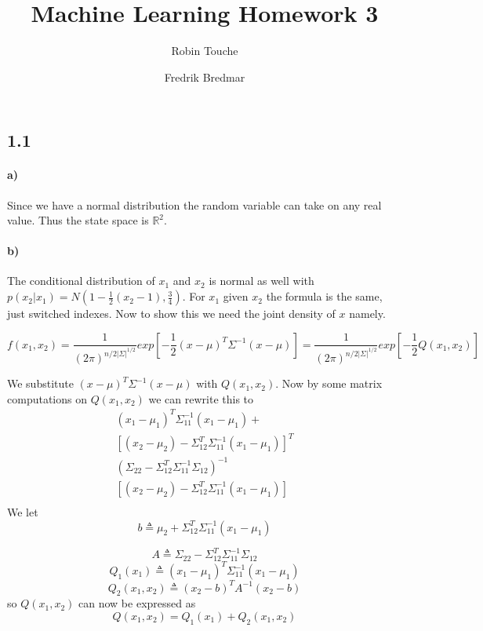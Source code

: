 \documentclass{article}
\author{
  Robin Touche \\
  \and
  Fredrik Bredmar
}
\title{Machine Learning Homework 3}
\begin{document}
\maketitle

\subsection*{1.1}
\paragraph{a)}

Since we have a normal distribution the random variable can take on any real
value. Thus the state space is $\mathbb{R}^2$.

\paragraph{b)}

The conditional distribution of $x_1$ and $x_2$ is normal as well with
$p(x_2|x_1) = N(1 - \frac{1}{2}(x_2 - 1), \frac{3}{4})$. For $x_1$ given $x_2$ 
the formula is the same, just switched indexes. 
Now to show this we need the joint density of $x$ namely.
     
$$ f(x_1, x_2) = \frac{1}{(2\pi)^{n/2|\Sigma|^{1/2}}}exp[-\frac{1}{2}(x-\mu)^T\Sigma^{-1}(x-\mu)] = \frac{1}{(2\pi)^{n/2|\Sigma|^{1/2}}}exp[-\frac{1}{2}Q(x_1,x_2)]$$


We substitute $(x-\mu)^T\Sigma^{-1}(x-\mu)$ with $Q(x_1,x_2)$. 
Now by some matrix computations on $Q(x_1,x_2)$ we can rewrite this to 
\begin{equation*}
  \begin{split}
(x_1 - \mu_1)^T\Sigma_{11}^{-1}(x_1 - \mu_1) + \\
[(x_2 - \mu_2) - \Sigma^T_{12}\Sigma^{-1}_{11}(x_1 - \mu_1)]^T \\
(\Sigma_{22} - \Sigma^T_{12}\Sigma_{11}^{-1}\Sigma_{12})^{-1} \\
[(x_2 - \mu_2) - \Sigma^T_{12}\Sigma^{-1}_{11}(x_1 - \mu_1)] \\
\end{split}
\end{equation*}
We let $$ b \triangleq \mu_2 + \Sigma^T_{12}\Sigma_{11}^{-1}(x_1 - \mu_1) $$

$$ A \triangleq \Sigma_{22} - \Sigma_{12}^T\Sigma_{11}^{-1}\Sigma_{12}$$
$$Q_1(x_1) \triangleq (x_1-\mu_1)^T\Sigma_{11}^{-1}(x_1 - \mu_1)$$
$$Q_2(x_1,x_2) \triangleq (x_2 - b)^TA^{-1}(x_2 - b)$$
so $Q(x_1,x_2)$ can now be expressed as
$$Q(x_1,x_2) = Q_1(x_1) + Q_2(x_1,x_2)$$
\end{document}
